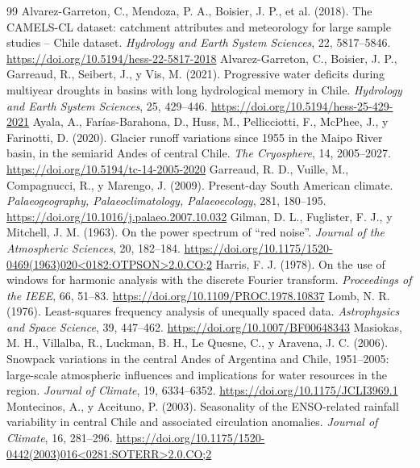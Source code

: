 \documentclass[11pt,letterpaper]{article}
\begin{document}
\begin{thebibliography}{99}\small
 Alvarez-Garreton, C., Mendoza, P. A., Boisier, J. P., et al. (2018). The CAMELS-CL dataset: catchment attributes and meteorology for large sample studies -- Chile dataset. \emph{Hydrology and Earth System Sciences}, 22, 5817--5846. \url{https://doi.org/10.5194/hess-22-5817-2018}
 Alvarez-Garreton, C., Boisier, J. P., Garreaud, R., Seibert, J., y Vis, M. (2021). Progressive water deficits during multiyear droughts in basins with long hydrological memory in Chile. \emph{Hydrology and Earth System Sciences}, 25, 429--446. \url{https://doi.org/10.5194/hess-25-429-2021}
 Ayala, A., Farías-Barahona, D., Huss, M., Pellicciotti, F., McPhee, J., y Farinotti, D. (2020). Glacier runoff variations since 1955 in the Maipo River basin, in the semiarid Andes of central Chile. \emph{The Cryosphere}, 14, 2005--2027. \url{https://doi.org/10.5194/tc-14-2005-2020}
 Garreaud, R. D., Vuille, M., Compagnucci, R., y Marengo, J. (2009). Present-day South American climate. \emph{Palaeogeography, Palaeoclimatology, Palaeoecology}, 281, 180--195. \url{https://doi.org/10.1016/j.palaeo.2007.10.032}
 Gilman, D. L., Fuglister, F. J., y Mitchell, J. M. (1963). On the power spectrum of ``red noise''. \emph{Journal of the Atmospheric Sciences}, 20, 182--184. \url{https://doi.org/10.1175/1520-0469(1963)020<0182:OTPSON>2.0.CO;2}
 Harris, F. J. (1978). On the use of windows for harmonic analysis with the discrete Fourier transform. \emph{Proceedings of the IEEE}, 66, 51--83. \url{https://doi.org/10.1109/PROC.1978.10837}
 Lomb, N. R. (1976). Least-squares frequency analysis of unequally spaced data. \emph{Astrophysics and Space Science}, 39, 447--462. \url{https://doi.org/10.1007/BF00648343}
 Masiokas, M. H., Villalba, R., Luckman, B. H., Le Quesne, C., y Aravena, J. C. (2006). Snowpack variations in the central Andes of Argentina and Chile, 1951--2005: large-scale atmospheric influences and implications for water resources in the region. \emph{Journal of Climate}, 19, 6334--6352. \url{https://doi.org/10.1175/JCLI3969.1}
 Montecinos, A., y Aceituno, P. (2003). Seasonality of the ENSO-related rainfall variability in central Chile and associated circulation anomalies. \emph{Journal of Climate}, 16, 281--296. \url{https://doi.org/10.1175/1520-0442(2003)016<0281:SOTERR>2.0.CO;2}

\end{thebibliography}
\end{document}
